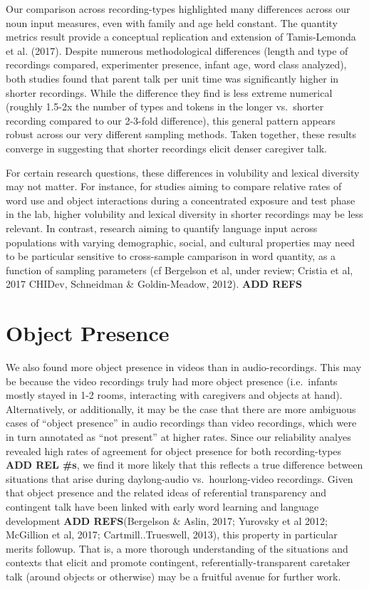 \documentclass[floatsintext,man]{apa6}
\theoremstyle{definition}
\theoremstyle{definition}
\theoremstyle{definition}
\theoremstyle{remark}
\begin{document}
Our comparison across recording-types highlighted many differences
across our noun input measures, even with family and age held constant.
The quantity metrics result provide a conceptual replication and
extension of Tamis-Lemonda et al. (2017). Despite numerous
methodological differences (length and type of recordings compared,
experimenter presence, infant age, word class analyzed), both studies
found that parent talk per unit time was significantly higher in shorter
recordings. While the difference they find is less extreme numerical
(roughly 1.5-2x the number of types and tokens in the longer vs.~shorter
recording compared to our 2-3-fold difference), this general pattern
appears robust across our very different sampling methods. Taken
together, these results converge in suggesting that shorter recordings
elicit denser caregiver talk.

For certain research questions, these differences in volubility and
lexical diversity may not matter. For instance, for studies aiming to
compare relative rates of word use and object interactions during a
concentrated exposure and test phase in the lab, higher volubility and
lexical diversity in shorter recordings may be less relevant. In
contrast, research aiming to quantify language input across populations
with varying demographic, social, and cultural properties may need to be
particular sensitive to cross-sample camparison in word quantity, as a
function of sampling parameters (cf Bergelson et al, under review;
Cristia et al, 2017 CHIDev, Schneidman \& Goldin-Meadow, 2012).
\textbf{ADD REFS}

\section{Object Presence}\label{object-presence}

We also found more object presence in videos than in audio-recordings.
This may be because the video recordings truly had more object presence
(i.e.~infants mostly stayed in 1-2 rooms, interacting with caregivers
and objects at hand). Alternatively, or additionally, it may be the case
that there are more ambiguous cases of \enquote{object presence} in
audio recordings than video recordings, which were in turn annotated as
\enquote{not present} at higher rates. Since our reliability analyes
revealed high rates of agreement for object presence for both
recording-types \textbf{ADD REL \#s}, we find it more likely that this
reflects a true difference between situations that arise during
daylong-audio vs.~hourlong-video recordings. Given that object presence
and the related ideas of referential transparency and contingent talk
have been linked with early word learning and language development
\textbf{ADD REFS}(Bergelson \& Aslin, 2017; Yurovsky et al 2012;
McGillion et al, 2017; Cartmill..Trueswell, 2013), this property in
particular merits followup. That is, a more thorough understanding of
the situations and contexts that elicit and promote contingent,
referentially-transparent caretaker talk (around objects or otherwise)
may be a fruitful avenue for further work.
\end{document}
